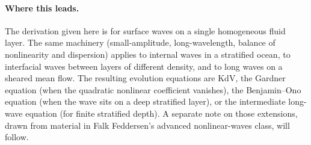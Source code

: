 \documentclass{article}
\begin{document}
\paragraph{Where this leads.} The derivation given here is for surface waves on a single homogeneous fluid layer. The same machinery (small-amplitude, long-wavelength, balance of nonlinearity and dispersion) applies to internal waves in a stratified ocean, to interfacial waves between layers of different density, and to long waves on a sheared mean flow. The resulting evolution equations are KdV, the Gardner equation (when the quadratic nonlinear coefficient vanishes), the Benjamin--Ono equation (when the wave sits on a deep stratified layer), or the intermediate long-wave equation (for finite stratified depth). A separate note on those extensions, drawn from material in Falk Feddersen's advanced nonlinear-waves class, will follow.
\end{document}
